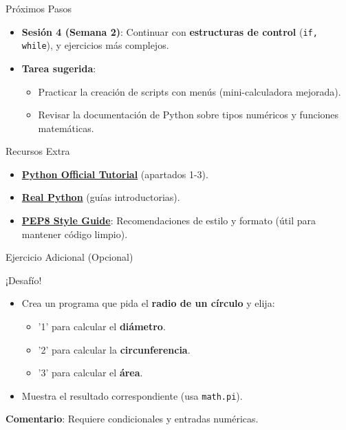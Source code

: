 \documentclass[10pt]{beamer}
\begin{document}
\begin{frame}{Próximos Pasos}
  \begin{itemize}
    \item \textbf{Sesión 4 (Semana 2)}: Continuar con \textbf{estructuras de control} (\texttt{if, while}), y ejercicios más complejos.
    \item \textbf{Tarea sugerida}:
      \begin{itemize}
        \item Practicar la creación de scripts con menús (mini-calculadora mejorada).
        \item Revisar la documentación de Python sobre tipos numéricos y funciones matemáticas.
      \end{itemize}
  \end{itemize}
\end{frame}

\begin{frame}{Recursos Extra}
  \begin{itemize}
    \item \href{https://docs.python.org/3/tutorial/}{\textbf{Python Official Tutorial}} (apartados 1-3).
    \item \href{https://realpython.com/}{\textbf{Real Python}} (guías introductorias).
    \item \href{https://peps.python.org/pep-0008/}{\textbf{PEP8 Style Guide}}: Recomendaciones de estilo y formato (útil para mantener código limpio).
  \end{itemize}
\end{frame}

\begin{frame}{Ejercicio Adicional (Opcional)}
  \begin{block}{¡Desafío!}
    \begin{itemize}
      \item Crea un programa que pida el \textbf{radio de un círculo} y elija:
        \begin{itemize}
          \item '1' para calcular el \textbf{diámetro}.
          \item '2' para calcular la \textbf{circunferencia}.
          \item '3' para calcular el \textbf{área}.
        \end{itemize}
      \item Muestra el resultado correspondiente (usa \texttt{math.pi}).
    \end{itemize}
  \end{block}
  \textbf{Comentario}: Requiere condicionales y entradas numéricas.
\end{frame}
\end{document}
